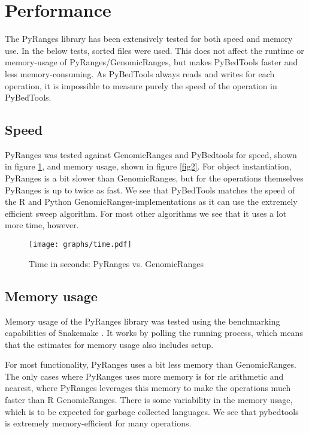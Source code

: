 \documentclass[10pt,letterpaper]{article}
\begin{document}
\section*{Performance}

The PyRanges library has been extensively tested for both speed and memory use.
In the below tests, sorted files were used. This does not affect the runtime or
memory-usage of PyRanges/GenomicRanges, but makes PyBedTools faster and less
memory-consuming. As PyBedTools always reads and writes for each operation, it
is impossible to measure purely the speed of the operation in PyBedTools.

\subsection*{Speed}

PyRanges was tested against GenomicRanges and PyBedtools for speed, shown in
figure \ref{fig1}, and memory usage, shown in figure \ref{fig2}. For object
instantiation, PyRanges is a bit slower than GenomicRanges, but for the
operations themselves PyRanges is up to twice as fast. We see that PyBedTools
matches the speed of the R and Python GenomicRanges-implementations as it can
use the extremely efficient sweep algorithm. For most other algorithms we see
that it uses a lot more time, however.

\begin{figure}
\texttt{[image: graphs/time.pdf]}
\caption{Time in seconds: PyRanges vs. GenomicRanges} %
\label{fig1} %
\end{figure} %

\subsection*{Memory usage}

Memory usage of the PyRanges library was tested using the benchmarking
capabilities of Snakemake \cite{doi:10.1093/bioinformatics/bty350}. It works by
polling the running process, which means that the estimates for memory usage
also includes setup.

For most functionality, PyRanges uses a bit less memory than GenomicRanges. The
only cases where PyRanges uses more memory is for rle arithmetic and nearest,
where PyRanges leverages this memory to make the operations much faster
than R GenomicRanges. There is some variability in the memory usage, which is to
be expected for garbage collected languages. We see that pybedtools is extremely
memory-efficient for many operations.
\end{document}
